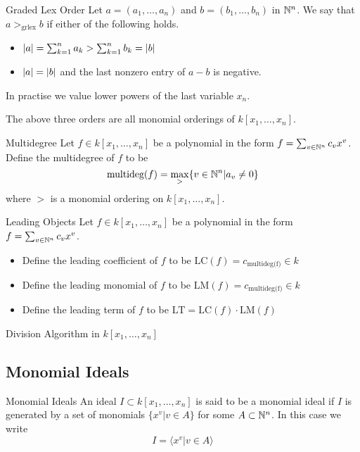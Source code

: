 \documentclass[a4paper]{article}
\begin{document}
\begin{defn}{Graded Lex Order}{} Let $a=(a_1,\dots,a_n)$ and $b=(b_1,\dots,b_n)$ in $\mathbb{N}^n$. We say that $a>_{\text{grlex}}b$ if either of the following holds. 
\begin{itemize}
\item $\abs{a}=\sum_{k=1}^na_k>\sum_{k=1}^nb_k=\abs{b}$
\item $\abs{a}=\abs{b}$ and the last nonzero entry of $a-b$ is negative. 
\end{itemize}
\end{defn}

In practise we value lower powers of the last variable $x_n$. 

\begin{prp}{}{} The above three orders are all monomial orderings of $k[x_1,\dots,x_n]$. 
\end{prp}

\begin{defn}{Multidegree}{} Let $f\in k[x_1,\dots,x_n]$ be a polynomial in the form $f=\sum_{v\in\mathbb{N}^n}c_vx^v$. Define the multidegree of $f$ to be $$\text{multideg}(f)=\max_>\{v\in\mathbb{N}^n|a_v\neq 0\}$$ where $>$ is a monomial ordering on $k[x_1,\dots,x_n]$. 
\end{defn}

\begin{defn}{Leading Objects}{} Let $f\in k[x_1,\dots,x_n]$ be a polynomial in the form $f=\sum_{v\in\mathbb{N}^n}c_vx^v$. 
\begin{itemize}
\item Define the leading coefficient of $f$ to be $\text{LC}(f)=c_\text{multideg(f)}\in k$
\item Define the leading monomial of $f$ to be $\text{LM}(f)=c_\text{multideg(f)}\in k$
\item Define the leading term of $f$ to be $\text{LT}=\text{LC}(f)\cdot\text{LM}(f)$
\end{itemize}
\end{defn}

\begin{prp}{Division Algorithm in $k[x_1,\dots,x_n]$}{}
\end{prp}

\subsection{Monomial Ideals}
\begin{defn}{Monomial Ideals}{} An ideal $I\subset k[x_1,\dots,x_n]$ is said to be a monomial ideal if $I$ is generated by a set of monomials $\{x^v|v\in A\}$ for some $A\subset\mathbb{N}^n$. In this case we write $$I=\langle x^v|v\in A\rangle$$
\end{defn}
\end{document}
